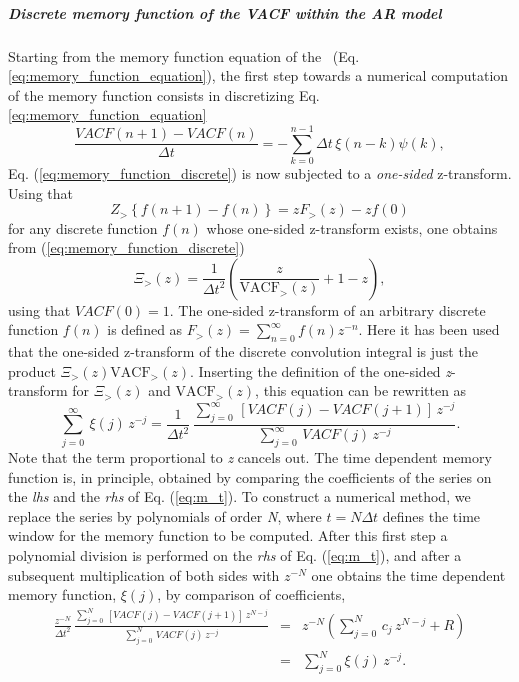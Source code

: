 \documentclass[a4paper,11pt]{report}
\begin{document}
\subparagraph{Discrete memory function of the VACF within the AR model}
Starting from the memory function equation of the \VACF\ (Eq. \ref{eq:memory_function_equation}), the first step towards a 
numerical computation of the memory function consists in discretizing Eq. \ref{eq:memory_function_equation} 
\begin{equation}
\label{eq:memory_function_discrete}
\frac{VACF(n+1)-VACF(n)}{\Delta t} = -\sum_{k=0}^{n-1} 
\Delta t\,\xi(n-k)\psi(k),
\end{equation}
Eq. (\ref{eq:memory_function_discrete}) is now subjected to a {\em one-sided} z-transform. Using that
\begin{equation}
Z_{>}\left\{f(n+1)-f(n)\right\} = 
zF_{>}(z) - zf(0)
\end{equation}
for any discrete function $f(n)$ whose one-sided z-transform exists, one obtains from (\ref{eq:memory_function_discrete})
\begin{equation}
\label{eq:xi_z}
\Xi_{>}(z) = \frac{1}{\Delta t^2} \left(\frac{z}{\mathrm{VACF}_{>}(z)} + 1 -
z\right),
\end{equation}
using that $VACF(0)=1$. The one-sided z-transform of an arbitrary discrete function $f(n)$ is defined as 
$F_{>}(z) = \sum_{n=0}^{\infty} f(n) z^{-n}$.
Here it has been used that the one-sided z-transform of the discrete convolution integral is just the product 
$\Xi_{>}(z)\mathrm{VACF}_{>}(z)$. Inserting the definition of the one-sided \textit{z}-transform for $\Xi_{>}(z)$ and 
$\mathrm{VACF}_{>}(z)$, this equation can be rewritten as
\begin{equation}
  \label{eq:m_t}
  \sum_{j=0}^\infty ~ \xi(j) \, z^{-j} = \frac{1}{\Delta t^2} \,
  \frac{\sum_{j=0}^\infty \, \left[VACF(j) - VACF(j+1)\right] \, z^{-j}}
  { \sum_{j=0}^\infty \, VACF(j) \, z^{-j} }. 
\end{equation}
Note that the term proportional to \textit{z} cancels out.  The time dependent memory function is, in principle, obtained by 
comparing the coefficients of the series on the {\em lhs} and the {\em rhs} of Eq. (\ref{eq:m_t}). To construct a numerical method, 
we replace the series by polynomials of order \textit{N}, where $t=N\Delta t$ defines the time window for the memory function to be computed. 
After this first step a polynomial division is performed on the {\em rhs} of Eq. (\ref{eq:m_t}), and after a subsequent multiplication 
of both sides with $z^{-N}$ one obtains the time dependent memory function, $\xi(j)$, by comparison of coefficients,
\begin{eqnarray}
\label{eq:xi_division}
  \frac{z^{-N}}{\Delta t^2}\,\frac{\sum_{j=0}^N \, \left[VACF(j) -
    VACF(j+1)\right] \, z^{N-j}} { \sum_{j=0}^N \, VACF(j) \,
    z^{-j}} &=&
  z^{-N} \left(\sum_{j=0}^N \, c_j \, z^{N-j} + R \right)\nonumber\\
  &=& \sum_{j=0}^N \xi(j) \, z^{-j}.
\end{eqnarray}
\end{document}
